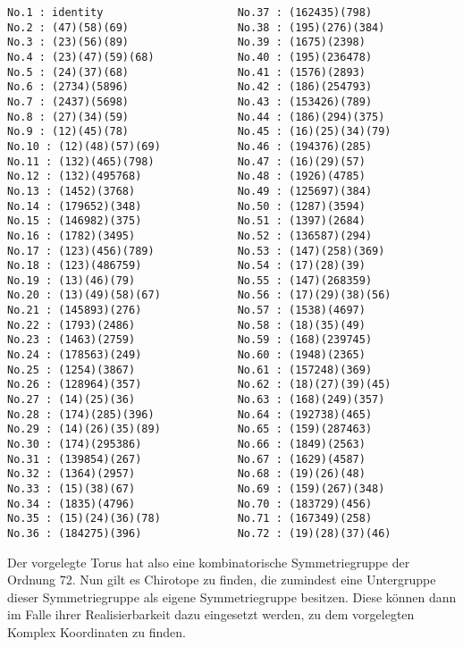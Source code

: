\begin{verbatim}
No.1 : identity                     No.37 : (162435)(798)
No.2 : (47)(58)(69)                 No.38 : (195)(276)(384)
No.3 : (23)(56)(89)                 No.39 : (1675)(2398)
No.4 : (23)(47)(59)(68)             No.40 : (195)(236478)
No.5 : (24)(37)(68)                 No.41 : (1576)(2893)
No.6 : (2734)(5896)                 No.42 : (186)(254793)
No.7 : (2437)(5698)                 No.43 : (153426)(789)
No.8 : (27)(34)(59)                 No.44 : (186)(294)(375)
No.9 : (12)(45)(78)                 No.45 : (16)(25)(34)(79)
No.10 : (12)(48)(57)(69)            No.46 : (194376)(285)
No.11 : (132)(465)(798)             No.47 : (16)(29)(57)
No.12 : (132)(495768)               No.48 : (1926)(4785)
No.13 : (1452)(3768)                No.49 : (125697)(384)
No.14 : (179652)(348)               No.50 : (1287)(3594)
No.15 : (146982)(375)               No.51 : (1397)(2684)
No.16 : (1782)(3495)                No.52 : (136587)(294)
No.17 : (123)(456)(789)             No.53 : (147)(258)(369)
No.18 : (123)(486759)               No.54 : (17)(28)(39)
No.19 : (13)(46)(79)                No.55 : (147)(268359)
No.20 : (13)(49)(58)(67)            No.56 : (17)(29)(38)(56)
No.21 : (145893)(276)               No.57 : (1538)(4697)
No.22 : (1793)(2486)                No.58 : (18)(35)(49)
No.23 : (1463)(2759)                No.59 : (168)(239745)
No.24 : (178563)(249)               No.60 : (1948)(2365)
No.25 : (1254)(3867)                No.61 : (157248)(369)
No.26 : (128964)(357)               No.62 : (18)(27)(39)(45)
No.27 : (14)(25)(36)                No.63 : (168)(249)(357)
No.28 : (174)(285)(396)             No.64 : (192738)(465)
No.29 : (14)(26)(35)(89)            No.65 : (159)(287463)
No.30 : (174)(295386)               No.66 : (1849)(2563)
No.31 : (139854)(267)               No.67 : (1629)(4587)
No.32 : (1364)(2957)                No.68 : (19)(26)(48)
No.33 : (15)(38)(67)                No.69 : (159)(267)(348)
No.34 : (1835)(4796)                No.70 : (183729)(456)
No.35 : (15)(24)(36)(78)            No.71 : (167349)(258)
No.36 : (184275)(396)               No.72 : (19)(28)(37)(46)
\end{verbatim}
Der vorgelegte Torus hat also eine kombinatorische Symmetriegruppe der
Ordnung 72. Nun gilt es Chirotope zu finden, die zumindest eine Untergruppe
dieser Symmetriegruppe als eigene Symmetriegruppe besitzen. Diese können dann
im Falle ihrer Realisierbarkeit dazu eingesetzt werden, zu dem vorgelegten
Komplex Koordinaten zu finden.

